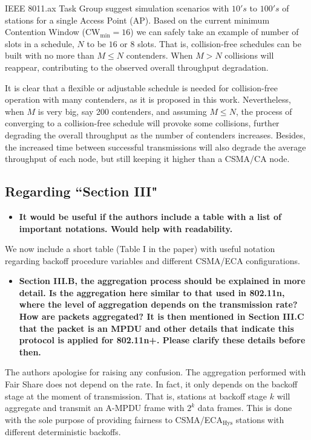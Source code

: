 \documentclass[]{article}
\begin{document}
		IEEE 8011.ax Task Group suggest simulation scenarios with $10's$ to $100's$ of stations for a single Access Point (AP). Based on the current minimum Contention Window (CW$_{\min}=16$) we can safely take an example of number of slots in a schedule, $N$ to be $16$ or $8$ slots. That is, collision-free schedules can be built with no more than $M\leq N$ contenders. When $M>N$ collisions will reappear, contributing to the observed overall throughput degradation. 
		
		It is clear that a flexible or adjustable schedule is needed for collision-free operation with many contenders, as it is proposed in this work. Nevertheless, when $M$ is very big, say 200 contenders, and assuming $M\leq N$, the process of converging to a collision-free schedule will provoke some collisions, further degrading the overall throughput as the number of contenders increases. Besides, the increased time between successful transmissions will also degrade the average throughput of each node, but still keeping it higher than a CSMA/CA node.

	\subsection{Regarding ``Section III"}
		\begin{itemize}
			\item {\bf It would be useful if the authors include a table with a list of important notations. Would help with readability.}
		\end{itemize}

		We now include a short table (Table I in the paper) with useful notation regarding backoff procedure variables and different CSMA/ECA configurations.

		\begin{itemize}
			\item {\bfseries Section III.B, the aggregation process should be explained in more detail. Is the aggregation here similar to that used in 802.11n, where the level of aggregation depends on the transmission rate? How are packets aggregated? It is then mentioned in Section III.C that the packet is an MPDU and other details that indicate this protocol is applied for 802.11n+. Please clarify these details before then.}
		\end{itemize}
		
 		The authors apologise for raising any confusion. The aggregation performed with Fair Share does not depend on 		the rate. In fact, it only depends on the backoff stage at the moment of transmission. That is, stations at backoff 		stage $k$ will aggregate and transmit an A-MPDU frame with $2^{k}$ data frames. This is done with the sole 			purpose of providing fairness to CSMA/ECA$_{\text{Hys}}$ stations with different deterministic backoffs.
		
\end{document}
